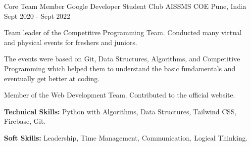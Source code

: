 

\begin{cventries}

  \cventry
    {Core Team Member Google Developer Student Club} %
    {AISSMS COE} %
    {Pune, India} %
    {Sept 2020 - Sept 2022} %
    {
      \begin{cvitems} %
        \item {Team leader of the Competitive Programming Team. Conducted many virtual and physical events for freshers and juniors.}
        \item {The events were based on Git, Data Structures, Algorithms, and Competitive Programming which helped them to understand the basic fundamentals and eventually get better at coding.}
        \item {Member of the Web Development Team. Contributed to the  official website.}
        \item {\textbf{Technical Skills:} Python with Algorithms, Data Structures, Tailwind CSS, Firebase, Git.}
        \item {\textbf{Soft Skills:} Leadership, Time Management, Communication, Logical Thinking.}
      \end{cvitems}
    }


\end{cventries}
